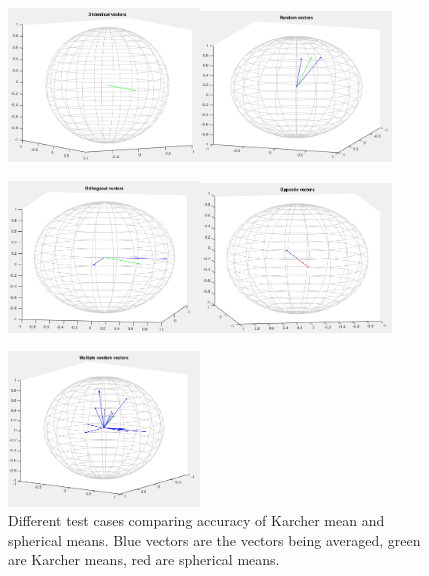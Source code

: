\documentclass[../tech_report_1.tex]{subfiles}
\begin{document}
\begin{figure}[ht]
\begin{centering}
\includegraphics[width=2in]{fig1}\includegraphics[width=2in]{fig2} 
\par\end{centering}

\begin{centering}
\includegraphics[width=2in]{fig3}\includegraphics[width=2in]{fig4}
\par\end{centering}

\begin{centering}
\includegraphics[width=2in]{fig5.png}
\par\end{centering}

\caption{Different test cases comparing accuracy of Karcher mean and spherical
means. Blue vectors are the vectors being averaged, green are Karcher means, red are spherical means. \label{fig:Different-test-cases}}


\end{figure}
\end{document}
